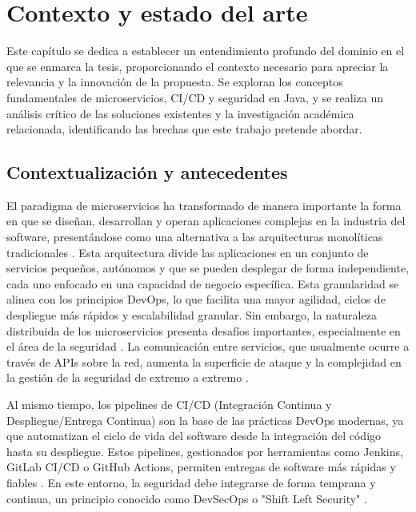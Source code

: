 \chapter{Contexto y estado del arte}\label{chap:contexto_estado_arte}

Este capítulo se dedica a establecer un entendimiento profundo del dominio en el que se enmarca la tesis, proporcionando el contexto necesario para apreciar la relevancia y la innovación de la propuesta. Se exploran los conceptos fundamentales de microservicios, CI/CD y seguridad en Java, y se realiza un análisis crítico de las soluciones existentes y la investigación académica relacionada, identificando las brechas que este trabajo pretende abordar.

\section{Contextualización y antecedentes}\label{sec:contextyantec}

El paradigma de microservicios ha transformado de manera importante la forma en que se diseñan, desarrollan y operan aplicaciones complejas en la industria del software, presentándose como una alternativa a las arquitecturas monolíticas tradicionales \cite{Zafeiropoulos2023SecurityGaps}. Esta arquitectura divide las aplicaciones en un conjunto de servicios pequeños, autónomos y que se pueden desplegar de forma independiente, cada uno enfocado en una capacidad de negocio específica. Esta granularidad se alinea con los principios DevOps, lo que facilita una mayor agilidad, ciclos de despliegue más rápidos y escalabilidad granular. Sin embargo, la naturaleza distribuida de los microservicios presenta desafíos importantes, especialmente en el área de la seguridad \cite{Zafeiropoulos2023SecurityGaps, AlDhuraibi2022SecurityIssues}. La comunicación entre servicios, que usualmente ocurre a través de APIs sobre la red, aumenta la superficie de ataque y la complejidad en la gestión de la seguridad de extremo a extremo \cite{AlDhuraibi2022SecurityIssues}.

Al mismo tiempo, los pipelines de CI/CD (Integración Continua y Despliegue/Entrega Continua) son la base de las prácticas DevOps modernas, ya que automatizan el ciclo de vida del software desde la integración del código hasta su despliegue. Estos pipelines, gestionados por herramientas como Jenkins, GitLab CI/CD o GitHub Actions, permiten entregas de software más rápidas y fiables \cite{Laukkanen2017BenefitsChallengesCICD, Duvall2007ContinuousIntegration}. En este entorno, la seguridad debe integrarse de forma temprana y continua, un principio conocido como DevSecOps o "Shift Left Security" \cite{Myrbakken2019DevSecOpsSLR, Kumar2022DevSecOpsReview}.

